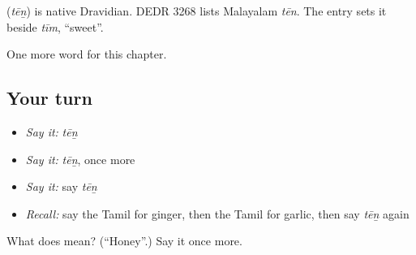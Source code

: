 \begin{cousinweb}
\textbf{} (\emph{tēṉ}) is native Dravidian. DEDR 3268 lists Malayalam \emph{tēn}. The entry sets it beside \emph{tīm}, \textquotedblleft{}sweet\textquotedblright{}.
\end{cousinweb}

\begin{grammarlens}[title={What you've built}]
One more word for this chapter.
\end{grammarlens}

\subsection*{Your turn}
\begin{itemize}
\raggedright
  \item \emph{Say it:} \emph{tēṉ}
  \item \emph{Say it:} \emph{tēṉ}, once more
  \item \emph{Say it:} say \emph{tēṉ}
  \item \emph{Recall:} say the Tamil for ginger, then the Tamil for garlic, then say \emph{tēṉ} again
\end{itemize}

\begin{tcolorbox}[breakable,colback=teal!4,colframe=teal!35!black,title={Before you move on}]
What does  mean? (\textquotedblleft{}Honey\textquotedblright{}.) Say it once more.
\end{tcolorbox}
